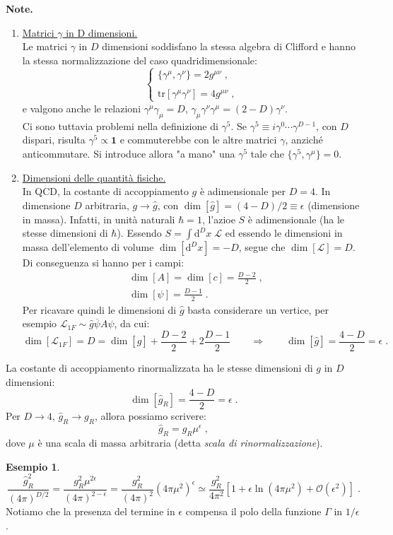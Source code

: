 \documentclass[12pt,a4paper]{article}
\theoremstyle{definition}
\newtheorem{exm}{Esempio}
\newcommand{\lag}{\mathcal{L}}
\newcommand{\diff}[1][]{\mathrm{d}#1}
\newcommand{\tr}{\mathrm{tr}}
\numberwithin{equation}{section}
\begin{document}
\textbf{Note.}
\begin{enumerate}
\item \underline{Matrici $\gamma$ in D dimensioni.} \\
Le matrici $\gamma$ in $D$ dimensioni soddisfano la stessa algebra di Clifford e hanno la stessa normalizzazione del caso quadridimensionale:
\begin{equation}
\begin{cases}
\{\gamma^{\mu},\gamma^{\nu}\}=2g^{\mu\nu}\;, \\
\\
\tr[\gamma^{\mu}\gamma^{\nu}]=4g^{\mu\nu}\;,
\end{cases}
\end{equation}
e valgono anche le relazioni $\gamma^{\mu}\gamma_{\mu}=D$, $\gamma_{\mu}\gamma^{\nu}\gamma^{\mu}=(2-D)\gamma^{\nu}$. \\
Ci sono tuttavia problemi nella definizione di $\gamma^5$. Se $\gamma^5\equiv i\gamma^0\cdots \gamma^{D-1}$, con $D$ dispari, risulta $\gamma^5\propto \mathbf{1}$ e commuterebbe con le altre matrici $\gamma$, anziché anticommutare. Si introduce allora "a mano" una $\gamma^5$ tale che $\{\gamma^5,\gamma^{\mu}\}=0$.
\item \underline{Dimensioni delle quantità fisiche.} \\
In QCD, la costante di accoppiamento $g$ è adimensionale per $D=4$. In dimensione $D$ arbitraria, $g\to \hat{g}$, con $\dim[\hat{g}]=(4-D)/2\equiv\epsilon$ (dimensione in massa). Infatti, in unità naturali $\hbar=1$, l'azioe $S$ è adimensionale (ha le stesse dimensioni di $\hbar$). Essendo $S=\int\diff^D{x}\;\lag$ ed essendo le dimensioni in massa dell'elemento di volume $\dim[\diff^D{x}]=-D$, segue che $\dim[\lag]=D$. Di conseguenza si hanno per i campi:
\begin{align*}
&\dim[A]=\dim[c]=\frac{D-2}{2}\;, \\
&\dim[\psi]=\frac{D-1}{2}\;.
\end{align*}
Per ricavare quindi le dimensioni di $\hat{g}$ basta considerare un vertice, per esempio $\lag_{1F}\sim \hat{g}\overline{\psi}A\psi$, da cui:
$$
\dim[\lag_{1F}]=D=\dim[\hat{g}]+\frac{D-2}{2}+2\frac{D-1}{2}\qquad \Longrightarrow \qquad \dim[\hat{g}]=\frac{4-D}{2}=\epsilon\;.
$$
\end{enumerate}
La costante di accoppiamento rinormalizzata ha le stesse dimensioni di $g$ in $D$ dimensioni:
\begin{equation}
\dim[\hat{g}_R]=\frac{4-D}{2}=\epsilon\;.
\end{equation}
Per $D\to 4$, $\hat{g}_R\to g_R$, allora possiamo scrivere:
\begin{equation}
\hat{g}_R=g_R\mu^{\epsilon}\;,
\end{equation}
dove $\mu$ è una scala di massa arbitraria (detta \emph{scala di rinormalizzazione}).
\begin{exm} 
$$
\frac{\hat{g}_R^2}{(4\pi)^{D/2}}=\frac{g_R^2\mu^{2\epsilon}}{(4\pi)^{2-\epsilon}}=\frac{g_R^2}{(4\pi)^2}(4\pi\mu^2)^{\epsilon}\simeq \frac{g_R^2}{4\pi^2}\left[1+\epsilon\ln(4\pi\mu^2)+\mathcal{O}(\epsilon^2)\right]\;.
$$
Notiamo che la presenza del termine in $\epsilon$ compensa il polo della funzione $\Gamma$ in $1/\epsilon$.
\end{exm}
\end{document}
